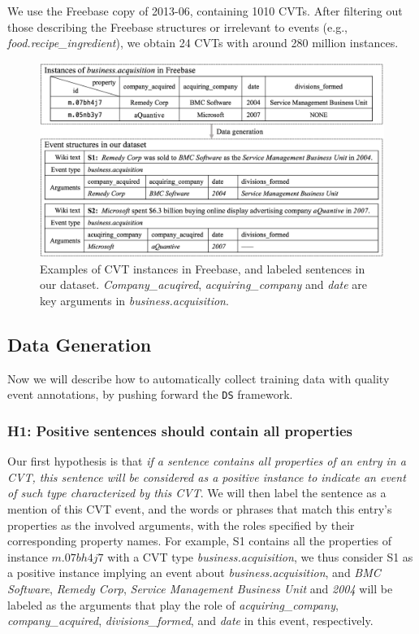 We use the Freebase copy of 2013-06,  %
containing 1010 CVTs. After filtering out those %
describing the Freebase structures  or irrelevant to events (e.g., \emph{food.recipe\_ingredient}), we obtain 24 CVTs with around 280 million instances.    
%
\begin{figure}[h]
	\centering
	\includegraphics[width=.48\textwidth]{temp}
	\caption{Examples of CVT instances in Freebase, and labeled sentences in our dataset. \emph{Company\_acuqired}, \emph{acquiring\_company} and \emph{date} are key arguments in \emph{business.acquisition}. \label{fig:3}}
\end{figure}

\subsection{Data Generation\label{datagen}}
Now we will describe how to automatically collect training data with quality event annotations, by pushing forward the \texttt{DS} framework.
\subsubsection{H1: Positive sentences should contain all properties}
Our first hypothesis is that \textit{if a sentence contains all properties of an entry in a CVT, this sentence will be 
considered as a positive instance to indicate an event of such type characterized by this CVT}.  
We will then label the sentence as a mention of this CVT event, and the words or phrases that 
match this entry's properties as the involved arguments, with the roles specified by their 
corresponding property names. 
For example, S1 contains all the properties of instance $m.07bh4j7$ with a CVT type \emph{business.acquisition}, 
we thus consider S1 as a positive instance implying an event about \emph{business.acquisition}, and \emph{BMC Software}, \emph{Remedy Corp}, \emph{Service Management Business Unit} and \emph{2004} will be labeled as the arguments that play the role of \emph{acquiring\_company}, \emph{company\_acquired}, \emph{divisions\_formed}, and \emph{date} in this event, respectively.

